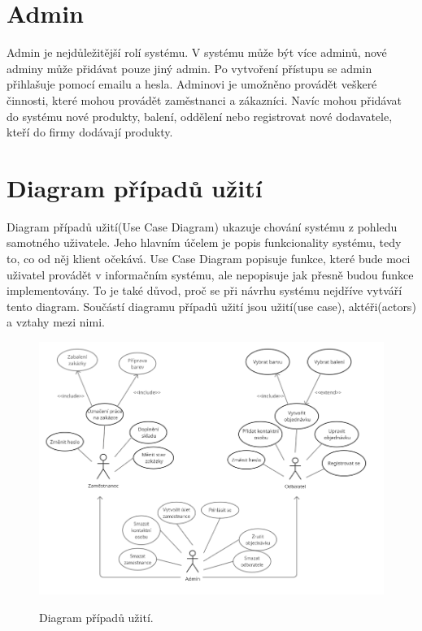 \section{Admin}

Admin je nejdůležitější rolí systému. V systému může být více adminů, nové adminy může přidávat pouze jiný admin. Po vytvoření přístupu se admin přihlašuje pomocí emailu a hesla. Adminovi je umožněno provádět veškeré činnosti, které mohou provádět zaměstnanci a zákazníci. Navíc mohou přidávat do systému nové produkty, balení, oddělení nebo registrovat nové dodavatele, kteří do firmy dodávají produkty.


\section{Diagram případů užití}
Diagram případů užití(Use Case Diagram) ukazuje chování systému z pohledu samotného uživatele. Jeho hlavním účelem je popis funkcionality systému, tedy to, co od něj klient očekává. Use Case Diagram popisuje funkce, které bude moci uživatel provádět v informačním systému, ale nepopisuje jak přesně budou funkce implementovány. To je také důvod, proč se při návrhu systému nejdříve vytváří tento diagram.
Součástí diagramu případů užití jsou užití(use case), aktéři(actors) a vztahy mezi nimi. \cite{usecase}

\newpage


\begin{figure}[H]
    \centering
    \includegraphics[width=200mm, angle=90]{obrazky-figures/use_case.png}
    \\
    \caption{Diagram případů užití.}
\end{figure}

